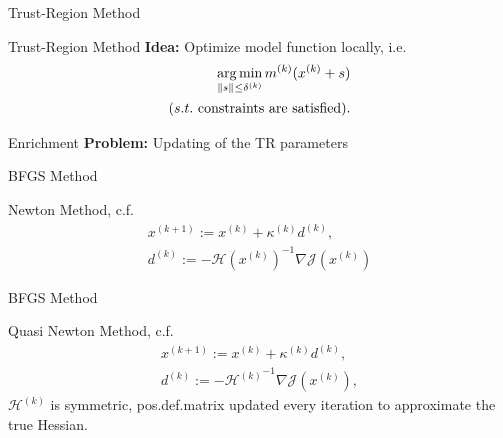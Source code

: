 \begin{frame}{Trust-Region Method}
    \begin{block}{Trust-Region Method}
        \textbf{Idea:} Optimize model function locally, i.e.\@
        \begin{align*}
            \operatorname*{arg\,min}\limits_{\left\lVert s\right\rVert_{} \leq \delta^{(k)}} m^{(k)}(x^{(k)} + s) \\
            (s.t. \text{ constraints are satisfied}).
        \end{align*}
    \end{block}
\end{frame}

\begin{frame}{Enrichment}
    \textbf{Problem:} Updating of the TR parameters
\end{frame}

\begin{frame}{BFGS Method}
    \begin{block}{Newton Method, c.f.~\cite{Nocedal2006}}
        \vspace*{-13pt}
        \begin{align*}
            x^{(k + 1)} := x^{(k)} + \kappa^{(k)} d^{(k)}, \\
            d^{(k)} := - {\mathcal{H}(x^{(k)})}^{-1} \nabla \mathcal{J}(x^{(k)})
        \end{align*}
    \end{block}
\end{frame}

\begin{frame}{BFGS Method}
    \begin{block}{Quasi Newton Method, c.f.~\cite{Kelley1999, Nocedal2006}}
        \vspace*{-13pt}
        \begin{align*}
            x^{(k + 1)} := x^{(k)} + \kappa^{(k)} d^{(k)}, \\
            d^{(k)} := - {\mathcal{H}^{(k)}}^{-1} \nabla \mathcal{J}(x^{(k)}),
        \end{align*}
        $\mathcal{H}^{(k)}$ is symmetric, pos.\@ def.\@ matrix updated every iteration to approximate the true Hessian.
    \end{block}
\end{frame}


